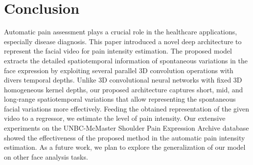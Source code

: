 \documentclass[a4paper,conference]{IEEEtran}
\begin{document}
\section{Conclusion}
Automatic pain assessment plays a crucial role in the healthcare applications, especially disease diagnosis. This paper introduced a novel deep architecture to represent the facial video for pain intensity estimation. The proposed model extracts the detailed spatiotemporal information of spontaneous variations in the face expression by exploiting several parallel 3D convolution operations with divers temporal depths. Unlike 3D convolutional neural networks with fixed 3D homogeneous kernel depths, our proposed architecture captures short, mid, and long-range spatiotemporal variations that allow representing the spontaneous facial variations more effectively. Feeding the obtained representation of the given video to a regressor, we estimate the level of pain intensity. Our extensive experiments on the UNBC-McMaster Shoulder Pain Expression Archive database showed the effectiveness of the proposed method in the automatic pain intensity estimation. As a future work, we plan to explore the generalization of our model on other face analysis tasks.







\end{document}
